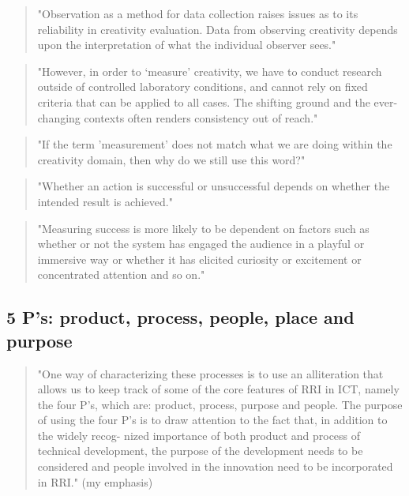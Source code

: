 \begin{quote}
  "Observation as a method for data collection raises issues as to its reliability in creativity evaluation. Data from observing creativity depends upon the interpretation of what the individual observer sees." \citep[p.22]{Candy2012}
\end{quote}

\begin{quote}
  "However, in order to ‘measure’ creativity, we have to conduct research outside of controlled laboratory conditions, and cannot rely on fixed criteria that can be applied to all cases. The shifting ground and the ever-changing contexts often renders consistency out of reach." \citep[p.22]{Candy2012}
\end{quote}

\begin{quote}
  "If the term 'measurement' does not match what we are doing within the creativity domain, then why do we still use this word?" \citep[p.22]{Candy2012}
\end{quote}

\begin{quote}
  "Whether an action is successful or unsuccessful depends on whether the intended result is achieved." \citep[p.23]{Candy2012}
\end{quote}

\begin{quote}
  "Measuring success is more likely to be dependent on factors such as whether or not the system has engaged the audience in a playful or immersive way or whether it has elicited curiosity or excitement or concentrated attention and so on." \citep[p.23]{Candy2012}
\end{quote}

\subsection{5 P’s: product, process, people, place and purpose}

\begin{quote}
  "One way of characterizing these processes is to use an alliteration that allows us to keep track of some of the core features of RRI in ICT, namely the four P's, which are: product, process, purpose and people. The purpose of using the four P's is to draw attention to the fact that, in addition to the widely recog- nized importance of both product and process of technical development, the purpose of the development needs to be considered and people involved in the innovation need to be incorporated in RRI." \citep[p.203]{Stahl2013} (my emphasis)
\end{quote}

